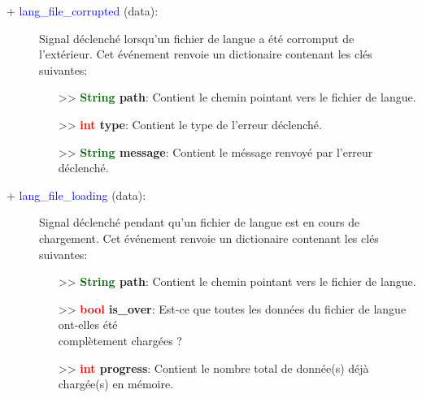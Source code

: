 \documentclass[a4paper, 11pt]{article}
\begin{document}
	\begin{description}
		\item [+ \textcolor{blue}{lang\_file\_corrupted} (data):] Signal déclenché lorsqu'un fichier de
		langue a été corromput de \\l'extérieur. Cet événement renvoie un dictionaire contenant les clés
		suivantes:
		\begin{itemize}
			\item [>> \textbf{\textcolor{darkgreen}{String} path}:] Contient le chemin pointant vers le
			fichier de langue.
			\item [>> \textbf{\textcolor{red}{int} type}:] Contient le type de l'erreur déclenché.
			\item [>> \textbf{\textcolor{darkgreen}{String} message}:] Contient le méssage renvoyé par 
			l'erreur déclenché.\\
		\end{itemize}
	\end{description}
	\begin{description}
		\item [+ \textcolor{blue}{lang\_file\_loading} (data):] Signal déclenché pendant qu'un fichier de
		langue est en cours de \\chargement. Cet événement renvoie un dictionaire contenant les clés
		suivantes:
		\begin{itemize}
			\item [>> \textbf{\textcolor{darkgreen}{String} path}:] Contient le chemin pointant vers le
			fichier de langue.
			\item [>> \textbf{\textcolor{red}{bool} is\_over}:] Est-ce que toutes les données du fichier de
			langue ont-elles été \\complètement chargées ?
			\item [>> \textbf{\textcolor{red}{int} progress}:] Contient le nombre total de donnée(s) déjà
			chargée(s) en mémoire.\\
		\end{itemize}
	\end{description}
\end{document}
